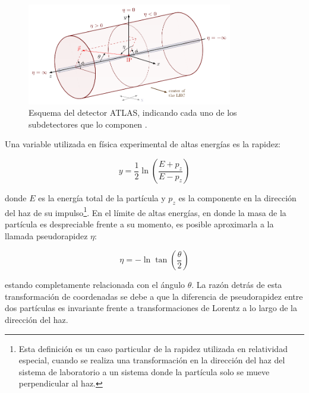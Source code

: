 \begin{figure}
\centering
  \includegraphics[width=0.8\textwidth]{images/lhc/atlas_coordinates2.pdf}
  \caption{Esquema del detector ATLAS, indicando cada uno de los subdetectores que lo componen \cite{atlas_coordinates}.}
  \label{fig:atlas_coordinates}
\end{figure}


Una variable utilizada en física experimental de altas energías es la rapidez:

\begin{equation}
y=\frac{1}{2}\ln\left( \frac{E+p_{z}}{E-p_{z}}\right)
\end{equation}

\noindent
donde $E$ es la energía total de la partícula y $p_{z}$ es la componente en la dirección del haz de su impulso\footnote{Esta definición es un caso particular de la rapidez utilizada en relatividad especial, cuando se realiza una transformación en la dirección del haz del sistema de laboratorio a un sistema donde la partícula solo se mueve perpendicular al haz.}. En el límite de altas energías, en donde la masa de la partícula es despreciable frente a su momento, es posible aproximarla a la llamada pseudorapidez $\eta$:

\begin{equation}
\eta =-\ln \tan\left( \frac{\theta}{2} \right)
\end{equation}

\noindent
estando completamente relacionada con el ángulo $\theta$. La razón detrás de esta transformación de coordenadas se debe a que
 la diferencia de pseudorapidez entre dos partículas es invariante frente a transformaciones de Lorentz a lo largo de la dirección del haz. 

